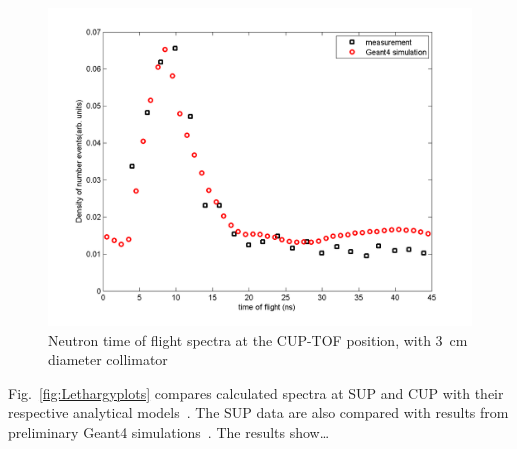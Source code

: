 \documentclass[11pt,a4paper]{IEEEtran}
\let\MYoriglatexcaption\caption
\renewcommand{\caption}[2][\relax]{\MYoriglatexcaption[#2]{#2}}
\begin{document}
\begin{figure}[t]
    \includegraphics[width=\columnwidth]{CUPTOFtofspectraRADECS.png}
    \caption{
        Neutron time of flight spectra at the CUP-TOF position, with \SI{3}{\cm} diameter collimator
        }
    \label{fig:TOFSpectra}
\end{figure}

Fig.~\ref{fig:Lethargyplots} compares calculated spectra at SUP and CUP with their respective analytical models~\cite{Prokofiev2009,Prokofiev2014}.
The SUP data are also compared with results from preliminary Geant4 simulations~\cite{Platt2013}.
The results show\ldots
{}
\end{document}
